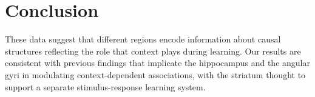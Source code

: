 \documentclass[10pt,letterpaper]{article}
\begin{document}
\section{Conclusion}

These data suggest that different regions encode information about causal structures reflecting the role that context plays during learning. Our results are consistent with previous findings that implicate the hippocampus and the angular gyri in modulating context-dependent associations, with the striatum thought to support a separate stimulus-response learning system.




\setlength{\bibleftmargin}{.125in}
\setlength{\bibindent}{-\bibleftmargin}


\end{document}
